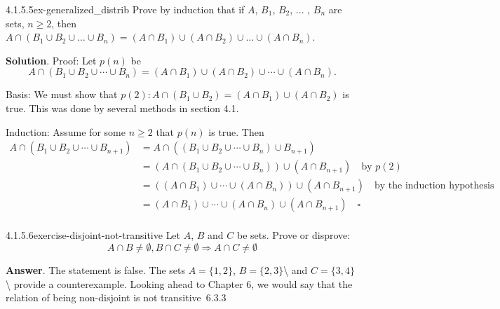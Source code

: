 \documentclass[twoside,10pt,]{book}
\numberwithin{equation}{section}
\begin{document}
\begin{divisionsolution}{4.1.5.5}{}{ex-generalized_distrib}%
\hypertarget{p-1573}{}%
Prove by induction that if \(A\), \(B_1\), \(B_2\), ... , \(B_n\) are sets, \(n\geq 2\), then \(A\cap ( B_1 \cup  B_2\cup  \dots  \cup  B_n) = (A \cap B_1) \cup  (A \cap B_2 ) \cup  \dots \cup  (A\cap B_n)\).%
\par\smallskip%
\noindent\textbf{Solution}.\quad%
\hypertarget{p-1574}{}%
Proof: Let \(p(n)\) be%
\begin{equation*}
A\cap (B_1\cup B_2\cup \cdots \cup B_n)=(A\cap B_1)\cup (A\cap B_2)\cup \cdots \cup (A\cap B_n)\text{.}
\end{equation*}
%
\par
\hypertarget{p-1575}{}%
Basis: We must show that \(p(2) : A \cap  (B_1 \cup B_2 )=(A\cap B_1) \cup (A\cap B_2)\) is true. This was done by several methods in section 4.1.%
\par
\hypertarget{p-1576}{}%
Induction: Assume for some \(n\geq 2\) that \(p(n)\) is true. Then%
\begin{equation*}
\begin{split}
A\cap (B_1\cup B_2\cup \cdots \cup B_{n+1})&=A\cap ((B_1\cup B_2\cup \cdots \cup B_n)\cup B_{n+1})\\
&=(A \cap (B_1\cup B_2\cup \cdots \cup B_n))\cup (A\cap B_{n+1}) \quad \textrm{by } p(2)\\
&=((A\cap B_1)\cup \cdots \cup (A\cap B_n))\cup (A\cap B_{n+1})\quad \textrm{by the induction hypothesis}\\
&=(A\cap B_1)\cup \cdots \cup (A\cap B_n)\cup (A\cap B_{n+1})\quad \square\\
\end{split}
\end{equation*}
%
\end{divisionsolution}%
\begin{divisionsolution}{4.1.5.6}{}{exercise-disjoint-not-transitive}%
\hypertarget{p-1577}{}%
Let \(A\), \(B\) and \(C\) be sets. Prove or disprove:%
\begin{equation*}
A \cap B \neq \emptyset,  B \cap C \neq \emptyset \Rightarrow A\cap C \neq \emptyset
\end{equation*}
%
\par\smallskip%
\noindent\textbf{Answer}.\quad%
\hypertarget{p-1578}{}%
The statement is false.  The sets \(A=\{1,2\}\), \(B=\{2,3\}\)\textbackslash{} and \(C=\{3,4\}\)\textbackslash{} provide a counterexample.  Looking ahead to Chapter 6, we would say that the relation of being non-disjoint is not transitive~6.3.3%
\end{divisionsolution}%
\end{document}

